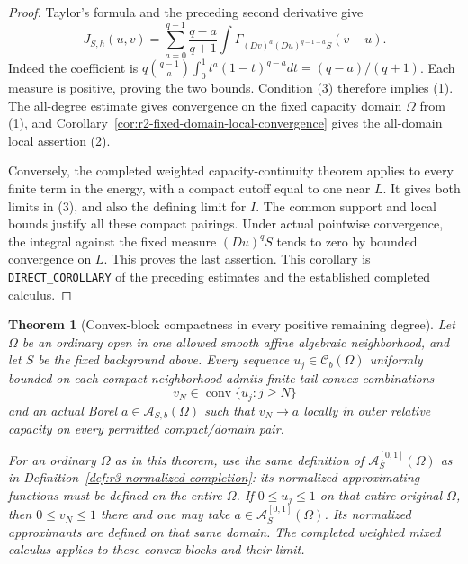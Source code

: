\documentclass[11pt,a4paper]{article}
\numberwithin{equation}{section}
\newtheorem{theorem}{Theorem}[section]
\theoremstyle{definition}
\theoremstyle{remark}
\newcommand{\Cb}{\mathcal C_b}
\begin{document}
\begin{proof}
Taylor's formula and the preceding second derivative give
\[
 J_{S,h}(u,v)=
 \sum_{a=0}^{q-1}\frac{q-a}{q+1}
       \int\Gamma_{(Dv)^a(Du)^{q-1-a}S}(v-u).
\]
Indeed the coefficient is
$q\binom{q-1}{a}\int_0^1t^a(1-t)^{q-a}dt=(q-a)/(q+1)$.
Each measure is positive, proving the two bounds.
Condition (3) therefore implies (1). The all-degree
estimate gives convergence on the fixed capacity domain
$\Omega$ from (1), and
Corollary~\ref{cor:r2-fixed-domain-local-convergence} gives
the all-domain local assertion (2).

Conversely, the completed weighted capacity-continuity
theorem applies to every finite term in the energy, with
a compact cutoff equal to one near $L$. It gives both
limits in (3), and also the defining limit for $I$.
The common support and local bounds justify all these
compact pairings. Under actual pointwise convergence,
the integral against the fixed measure $(Du)^qS$ tends
to zero by bounded convergence on $L$. This proves the
last assertion. This corollary is
\texttt{DIRECT\_COROLLARY} of the preceding estimates
and the established completed calculus.
\end{proof}

\begin{theorem}[Convex-block compactness in every positive remaining degree]
\label{thm:r3-all-degree-convex-blocks}
Let $\Omega$ be an ordinary open in one allowed smooth affine
algebraic neighborhood, and let $S$ be the fixed background above.
Every sequence $u_j\in\Cb(\Omega)$ uniformly bounded on each
compact neighborhood admits finite tail convex combinations
\[
 v_N\in\operatorname{conv}\{u_j:j\geq N\}
\]
and an actual Borel $a\in\mathcal A_{S,b}(\Omega)$ such that
$v_N\to a$ locally in outer relative capacity on every permitted
compact/domain pair.

For an ordinary $\Omega$ as in this theorem, use the same definition
of $\mathcal A_S^{[0,1]}(\Omega)$ as in
Definition~\ref{def:r3-normalized-completion}: its normalized
approximating functions must be defined on the entire $\Omega$.
If $0\leq u_j\leq1$ on that entire original $\Omega$, then
$0\leq v_N\leq1$ there and one may take
$a\in\mathcal A_S^{[0,1]}(\Omega)$. Its normalized approximants
are defined on that same domain. The completed weighted mixed
calculus applies to these convex blocks and their limit.
\end{theorem}
\end{document}
